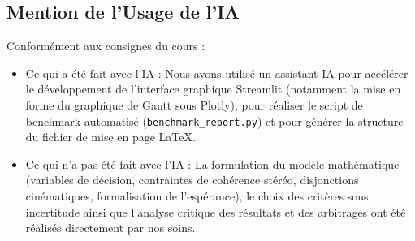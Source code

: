 \subsection{Mention de l'Usage de l'IA}
Conformément aux consignes du cours :
\begin{itemize}
    \item Ce qui a été fait avec l'IA : Nous avons utilisé un assistant IA pour accélérer le développement de l'interface graphique Streamlit (notamment la mise en forme du graphique de Gantt sous Plotly), pour réaliser le script de benchmark automatisé (\texttt{benchmark\_report.py}) et pour générer la structure du fichier de mise en page \LaTeX.
    \item Ce qui n'a pas été fait avec l'IA : La formulation du modèle mathématique (variables de décision, contraintes de cohérence stéréo, disjonctions cinématiques, formalisation de l'espérance), le choix des critères sous incertitude ainsi que l'analyse critique des résultats et des arbitrages ont été réalisés directement par nos soins.
\end{itemize}
